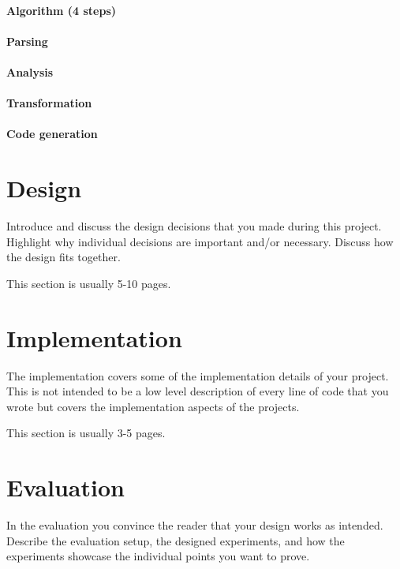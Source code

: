 \documentclass[a4paper,11pt,oneside]{report}
\begin{document}
\subsubsection{Algorithm (4 steps)}
\subsubsection{Parsing}
\subsubsection{Analysis}
\subsubsection{Transformation}
\subsubsection{Code generation}




\chapter{Design}

Introduce and discuss the design decisions that you made during this project.
Highlight why individual decisions are important and/or necessary. Discuss
how the design fits together.

This section is usually 5-10 pages.


\chapter{Implementation}

The implementation covers some of the implementation details of your project.
This is not intended to be a low level description of every line of code that
you wrote but covers the implementation aspects of the projects.

This section is usually 3-5 pages.


\chapter{Evaluation}

In the evaluation you convince the reader that your design works as intended.
Describe the evaluation setup, the designed experiments, and how the
experiments showcase the individual points you want to prove.
\end{document}

